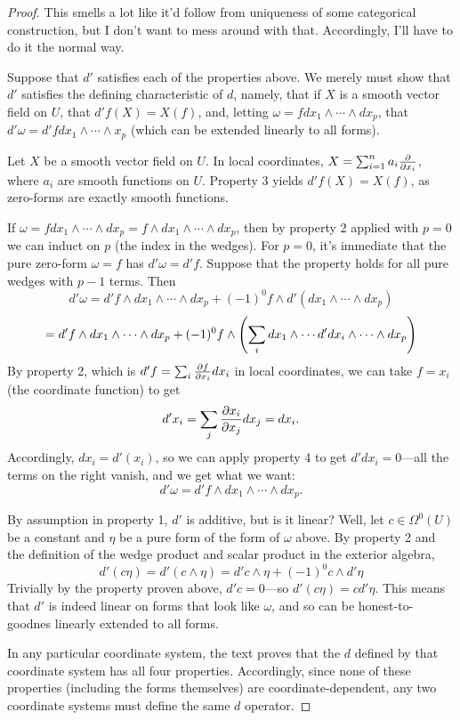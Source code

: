 \documentclass{article}
\begin{document}
\begin{proof}
  This smells a lot like it'd follow from uniqueness of some categorical construction, but I don't want to mess around with that.
  Accordingly, I'll have to do it the normal way.

  Suppose that  $d'$ satisfies each of the properties above.
  We merely must show that $d'$ satisfies the defining characteristic of $d$, namely, that if $X$ is a smooth vector field
  on $U$, that $d'f(X) = X(f)$, and, letting $\omega = fdx_{1} \wedge \cdots \wedge dx_{p}$,
  that $d'\omega = d'fdx_{1} \wedge \cdots \wedge x_{p}$ (which can be extended linearly to all forms).

  Let $X$ be a smooth vector field on $U$.
  In local coordinates, $X = \sum_{i = 1}^{n}a_{i}\pdv{x_{i}}$, where $a_{i}$ are smooth functions on $U$.
  Property 3 yields $d'f(X) = X(f)$, as zero-forms are exactly smooth functions.

  If $\omega = fdx_{1} \wedge \cdots \wedge dx_{p} = f \wedge dx_{1} \wedge \cdots \wedge dx_{p}$, then by property 2
  applied with $p = 0$ we can induct on $p$ (the index in the wedges).
  For $p = 0$, it's immediate that the pure zero-form $\omega = f$ has $d'\omega = d'f$.
  Suppose that the property holds for all pure wedges with $p - 1$ terms.
  Then
  \[
    d'\omega = d'f \wedge dx_{1} \wedge \cdots \wedge dx_{p} + (-1)^{0}f \wedge d'(dx_{1} \wedge \cdots \wedge dx_{p})
  \]
  \[
    = d'f \wedge dx_{1} \wedge \cdots \wedge dx_{p} + (-1)^{0}f \wedge \qty(\sum_{i}dx_{1} \wedge \cdots d'dx_{i} \wedge \cdots \wedge dx_{p})
  \]
  By property 2, which is $d'f = \sum_{i}\pdv{f}{x_{i}}dx_{i}$ in local coordinates, we can take $f = x_{i}$ (the coordinate function) to get
  \[
    d'x_{i} = \sum_{j}\pdv{x_{i}}{x_{j}}dx_{j} = dx_{i}.
  \]
  Accordingly, $dx_{i} = d'(x_{i})$, so we can apply property 4 to get $d'dx_{i} = 0$---all the terms on the right vanish,
  and we get what we want:
  \[
    d'\omega = d'f \wedge dx_{1} \wedge \cdots \wedge dx_{p}.
  \]

  By assumption in property 1, $d'$ is additive, but is it linear?
  Well, let $c \in \Omega^{0}(U)$ be a constant and $\eta$ be a pure form of the form of $\omega$ above.
  By property 2 and the definition of the wedge product and scalar product in the exterior algebra,
  \[
    d'(c\eta) = d'(c \wedge \eta) = d'c \wedge \eta + (-1)^{0}c \wedge d'\eta
  \]
  Trivially by the property proven above, $d'c = 0$---so $d'(c\eta) = cd'\eta$.
  This means that $d'$ is indeed linear on forms that look like $\omega$, and so can be honest-to-goodnes linearly extended to all forms.

  In any particular coordinate system, the text proves that the $d$ defined by that coordinate system has all four properties.
  Accordingly, since none of these properties (including the forms themselves) are coordinate-dependent,
  any two coordinate systems must define the same $d$ operator.
\end{proof}
\end{document}
